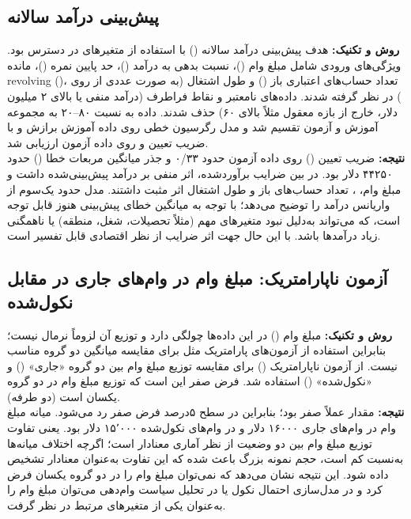 \documentclass[12pt]{article}
\begin{document}
	\subsection{ پیش‌بینی درآمد سالانه}
	\textbf{روش و تکنیک:} هدف پیش‌بینی درآمد سالانه () با استفاده از متغیرهای در دسترس بود. ویژگی‌های ورودی شامل مبلغ وام ()، نسبت بدهی به درآمد ()، حد پایین نمره  ()، مانده revolving ()، تعداد حساب‌های اعتباری باز () و طول اشتغال (به صورت عددی از روی ) در نظر گرفته شدند. داده‌های نامعتبر و نقاط فراطرف (درآمد منفی یا بالای ۲ میلیون دلار،  خارج از بازه معقول مثلاً بالای ۶۰) حذف شدند. داده به نسبت ۸۰–۲۰ به مجموعه آموزش و آزمون تقسیم شد و مدل رگرسیون خطی روی داده آموزش برازش و با ضریب تعیین و  روی داده آزمون ارزیابی شد.
	~\\
	\textbf{نتیجه:} ضریب تعیین () روی داده آزمون حدود ۰/۳۳ و جذر میانگین مربعات خطا () حدود ۴۴۲۵۰ دلار بود. در بین ضرایب برآوردشده،  اثر منفی بر درآمد پیش‌بینی‌شده داشت و مبلغ وام، ، تعداد حساب‌های باز و طول اشتغال اثر مثبت داشتند. مدل حدود یک‌سوم از واریانس درآمد را توضیح می‌دهد؛ با توجه به میانگین خطای پیش‌بینی هنوز قابل توجه است، که می‌تواند به‌دلیل نبود متغیرهای مهم (مثلاً تحصیلات، شغل، منطقه) یا ناهمگنی زیاد درآمدها باشد. با این حال جهت اثر ضرایب از نظر اقتصادی قابل تفسیر است.

	\subsection{آزمون ناپارامتریک: مبلغ وام در وام‌های جاری در مقابل نکول‌شده}
	\textbf{روش و تکنیک:} مبلغ وام () در این داده‌ها چولگی دارد و توزیع آن لزوماً نرمال نیست؛ بنابراین استفاده از آزمون‌های پارامتریک مثل  برای مقایسه میانگین دو گروه مناسب نیست. از آزمون ناپارامتریک   () برای مقایسه توزیع مبلغ وام بین دو گروه «جاری» () و «نکول‌شده» () استفاده شد. فرض صفر این است که توزیع مبلغ وام در دو گروه یکسان است (دو طرفه).
	~\\
	\textbf{نتیجه:} مقدار  عملاً صفر بود؛ بنابراین در سطح ۵درصد فرض صفر رد می‌شود. میانه مبلغ وام در وام‌های جاری ۱۶۰۰۰ دلار و در وام‌های نکول‌شده ۱۵٬۰۰۰ دلار بود. یعنی تفاوت توزیع مبلغ وام بین دو وضعیت از نظر آماری معنادار است؛ اگرچه اختلاف میانه‌ها به‌نسبت کم است، حجم نمونه بزرگ باعث شده که این تفاوت به‌عنوان معنادار تشخیص داده شود. این نتیجه نشان می‌دهد که نمی‌توان مبلغ وام را در دو گروه یکسان فرض کرد و در مدل‌سازی احتمال نکول یا در تحلیل سیاست وام‌دهی می‌توان مبلغ وام را به‌عنوان یکی از متغیرهای مرتبط در نظر گرفت.
\end{document}
